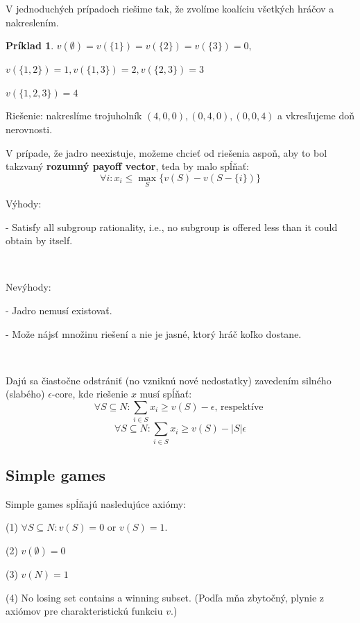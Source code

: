 \documentclass[a5paper,12pt]{article}
\newtheorem*{exampl}{Pr\'iklad}
\begin{document}
      V jednoduch\'ych pr\'ipadoch rie\v{s}ime tak, \v{z}e zvol\'ime koal\'iciu v\v{s}etk\'ych hr\'a\v{c}ov a nakreslen\'im.

      \begin{exampl}
      $v(\emptyset)= v(\{1\})=v(\{2\})=v(\{3\})=0,$

      $v(\{1,2\})= 1, v(\{1,3\})=2, v(\{2,3\})=3$

      $v(\{1,2,3\})= 4$

      \end{exampl}

      Rie\v{s}enie: nakresl\'ime trojuholn\'ik $(4,0,0), (0,4,0), (0,0,4)$ a vkres\v{l}ujeme do\v{n} nerovnosti.

      V pr\'ipade, \v{z}e jadro neexistuje, mo\v{z}eme chcie\v{t} od rie\v{s}enia aspo\v{n}, aby to bol takzvan\'y {\bf rozumn\'y payoff vector}, teda by malo sp\'l\v{n}a\v{t}: 
      \[ \forall i: x_{i} \leq \max_{S}\{v(S)-v(S-\{i\})\}\]


      V\'yhody: 

      - Satisfy all subgroup rationality, i.e., no subgroup is offered less than it could obtain by itself.

      \

      Nev\'yhody: 

      - Jadro nemus\'i existova\v{t}.

      - Mo\v{z}e n\'ajs\v{t} mno\v{z}inu rie\v{s}en\'i a nie je jasn\'e, ktor\'y hr\'a\v{c} ko\v{l}ko dostane.

      \

      Daj\'u sa \v{c}iasto\v{c}ne odstr\'ani\v{t} (no vznikn\'u nov\'e nedostatky) zaveden\'im siln\'eho (slab\'eho) $\epsilon$-core, kde rie\v{s}enie $x$ mus\'i sp\'l\v{n}a\v{t}:
      \[\forall S \subseteq N: \sum_{i \in S}x_{i} \geq v(S) - \epsilon  \textrm{, respekt\'ive }\] 
      \[\forall S \subseteq N: \sum_{i \in S}x_{i} \geq v(S) - |S|\epsilon \]

    \subsection{Simple games}
      Simple games sp\'l\v{n}aj\'u nasleduj\'uce axi\'omy:

      (1) $\forall S \subseteq N: v(S)=0$ or $v(S)=1$.

      (2) $v(\emptyset)=0$

      (3) $v(N)=1$

      (4) No losing set contains a winning subset. (Pod\v{l}a m\v{n}a zbyto\v{c}n\'y, plynie z axi\'omov pre charakteristick\'u funkciu $v$.)
\end{document}
